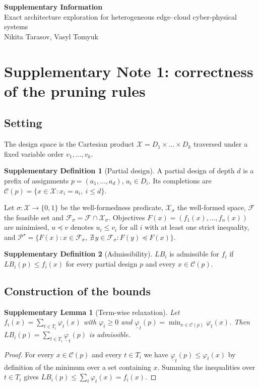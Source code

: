 \documentclass[preprint,11pt,3p]{elsarticle}
\theoremstyle{plain}
\newtheorem{lemma}{Supplementary Lemma}
\theoremstyle{definition}
\newtheorem{definition}{Supplementary Definition}
\newcommand{\X}{\mathcal{X}}
\newcommand{\C}{\mathcal{C}}
\newcommand{\F}{\mathcal{F}}
\newcommand{\PS}{\mathcal{P}^{\star}}
\newcommand{\LB}{\mathit{LB}}
\begin{document}
\begin{center}
{\Large\bfseries Supplementary Information}\\[2mm]
{\large Exact architecture exploration for heterogeneous edge--cloud
cyber-physical systems}\\[2mm]
Nikita Tarasov, Vasyl Tomyuk
\end{center}

\vspace{4mm}
\tableofcontents
\clearpage

\section*{Supplementary Note 1: correctness of the pruning rules}

\subsection*{Setting}
The design space is the Cartesian product $\X=D_1\times\dots\times D_k$ traversed under a
fixed variable order $v_1,\dots,v_k$.

\begin{definition}[Partial design]
A partial design of depth $d$ is a prefix of assignments $p=(a_1,\dots,a_d)$,
$a_i\in D_i$. Its completions are $\C(p)=\{x\in\X: x_i=a_i,\ i\le d\}$.
\end{definition}

Let $\sigma:\X\to\{0,1\}$ be the well-formedness predicate, $\X_\sigma$ the well-formed
space, $\F$ the feasible set and $\F_\sigma=\F\cap\X_\sigma$. Objectives
$F(x)=(f_1(x),\dots,f_n(x))$ are minimised, $u\preceq v$ denotes $u_i\le v_i$ for all $i$
with at least one strict inequality, and
$\PS=\{F(x): x\in\F_\sigma,\ \nexists\,y\in\F_\sigma: F(y)\preceq F(x)\}$.

\begin{definition}[Admissibility]
$\LB_i$ is admissible for $f_i$ if $\LB_i(p)\le f_i(x)$ for every partial design $p$ and
every $x\in\C(p)$.
\end{definition}

\subsection*{Construction of the bounds}

\begin{lemma}[Term-wise relaxation]
\label{lem:s:relax}
Let $f_i(x)=\sum_{t\in T_i}\varphi_t(x)$ with $\varphi_t\ge0$ and
$\underline{\varphi}_t(p)=\min_{x\in\C(p)}\varphi_t(x)$. Then
$\LB_i(p)=\sum_{t\in T_i}\underline{\varphi}_t(p)$ is admissible.
\end{lemma}
\begin{proof}
For every $x\in\C(p)$ and every $t\in T_i$ we have $\underline{\varphi}_t(p)\le
\varphi_t(x)$ by definition of the minimum over a set containing $x$. Summing the
inequalities over $t\in T_i$ gives $\LB_i(p)\le\sum_t\varphi_t(x)=f_i(x)$.
\end{proof}
\end{document}
